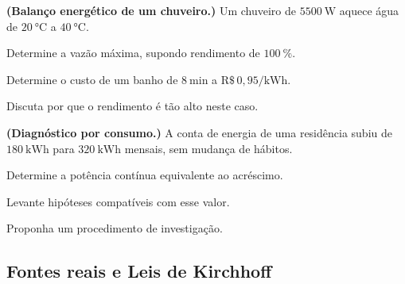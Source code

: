 \begin{questao}[4]{}

\textbf{(Balanço energético de um chuveiro.)} Um chuveiro de
$\SI{5500}{\watt}$ aquece água de $\SI{20}{\celsius}$ a
$\SI{40}{\celsius}$.
\begin{itensq}
\item Determine a vazão máxima, supondo rendimento de $\SI{100}{\percent}$.
\item Determine o custo de um banho de $\SI{8}{\minute}$ a
      $\mathrm{R\$}\,0{,}95/\si{\kilo\watt\hour}$.
\item Discuta por que o rendimento é tão alto neste caso.
\end{itensq}


\end{questao}
\begin{questao}[4]{}

\textbf{(Diagnóstico por consumo.)} A conta de energia de uma residência subiu
de $\SI{180}{\kilo\watt\hour}$ para $\SI{320}{\kilo\watt\hour}$ mensais, sem
mudança de hábitos.
\begin{itensq}
\item Determine a potência contínua equivalente ao acréscimo.
\item Levante hipóteses compatíveis com esse valor.
\item Proponha um procedimento de investigação.
\end{itensq}


\end{questao}


\subsection{Fontes reais e Leis de Kirchhoff}

